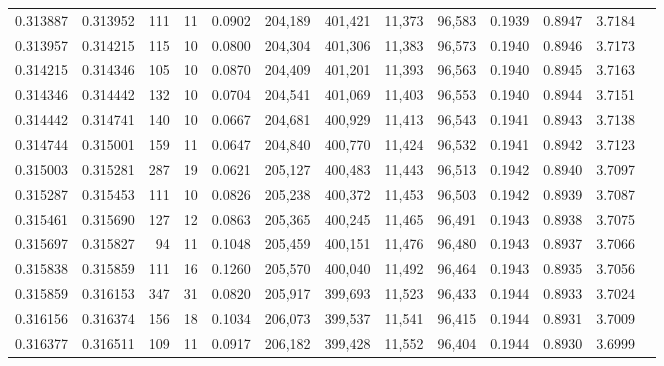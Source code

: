 \begin{tabular}{rrrrrrrrrrrrr}
0.313887 & 0.313952 &   111 &  11 &                                     0.0902 & 204,189 & 401,421 &  11,373 &  96,583 & 0.1939 & 0.8947 & 3.7184 \\
0.313957 & 0.314215 &   115 &  10 &                                     0.0800 & 204,304 & 401,306 &  11,383 &  96,573 & 0.1940 & 0.8946 & 3.7173 \\
0.314215 & 0.314346 &   105 &  10 &                                     0.0870 & 204,409 & 401,201 &  11,393 &  96,563 & 0.1940 & 0.8945 & 3.7163 \\
0.314346 & 0.314442 &   132 &  10 &                                     0.0704 & 204,541 & 401,069 &  11,403 &  96,553 & 0.1940 & 0.8944 & 3.7151 \\
0.314442 & 0.314741 &   140 &  10 &                                     0.0667 & 204,681 & 400,929 &  11,413 &  96,543 & 0.1941 & 0.8943 & 3.7138 \\
0.314744 & 0.315001 &   159 &  11 &                                     0.0647 & 204,840 & 400,770 &  11,424 &  96,532 & 0.1941 & 0.8942 & 3.7123 \\
0.315003 & 0.315281 &   287 &  19 &                                     0.0621 & 205,127 & 400,483 &  11,443 &  96,513 & 0.1942 & 0.8940 & 3.7097 \\
0.315287 & 0.315453 &   111 &  10 &                                     0.0826 & 205,238 & 400,372 &  11,453 &  96,503 & 0.1942 & 0.8939 & 3.7087 \\
0.315461 & 0.315690 &   127 &  12 &                                     0.0863 & 205,365 & 400,245 &  11,465 &  96,491 & 0.1943 & 0.8938 & 3.7075 \\
0.315697 & 0.315827 &    94 &  11 &                                     0.1048 & 205,459 & 400,151 &  11,476 &  96,480 & 0.1943 & 0.8937 & 3.7066 \\
0.315838 & 0.315859 &   111 &  16 &                                     0.1260 & 205,570 & 400,040 &  11,492 &  96,464 & 0.1943 & 0.8935 & 3.7056 \\
0.315859 & 0.316153 &   347 &  31 &                                     0.0820 & 205,917 & 399,693 &  11,523 &  96,433 & 0.1944 & 0.8933 & 3.7024 \\
0.316156 & 0.316374 &   156 &  18 &                                     0.1034 & 206,073 & 399,537 &  11,541 &  96,415 & 0.1944 & 0.8931 & 3.7009 \\
0.316377 & 0.316511 &   109 &  11 &                                     0.0917 & 206,182 & 399,428 &  11,552 &  96,404 & 0.1944 & 0.8930 & 3.6999 \\

\end{tabular}

